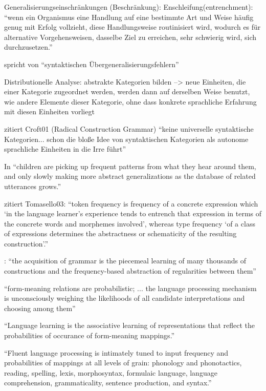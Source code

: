         Generalisierungseinschränkungen (Beschränkung):
        Enschleifung(entrenchment): ``wenn ein Organismus eine Handlung auf eine bestimmte Art und Weise häufig genug mit Erfolg vollzieht, diese Handlungsweise routinisiert wird, wodurch es für alternative Vorgehensweisen, dasselbe Ziel zu erreichen, sehr schwierig wird, sich durchzusetzen.''

        spricht von ``syntaktischen Übergeneralisierungsfehlern''

        Distributionelle Analyse: abstrakte Kategorien bilden --> neue Einheiten, die einer Kategorie zugeordnet werden, werden dann auf derselben Weise benutzt, wie andere Elemente dieser Kategorie, ohne dass konkrete sprachliche Erfahrung mit diesen Einheiten vorliegt

        \cite{Tomasello06} zitiert Croft01 (Radical Construction Grammar) ``keine universelle syntaktische Kategorien... schon die bloße Idee von syntaktischen Kategorien als autonome sprachliche Einheiten in die Irre führt''

        In \cite{Ellis08} ``children are picking up frequent patterns from what they hear around them, and only slowly making more abstract generalizations as the database of related utterances grows.''

        \cite{Eskildsen08} zitiert Tomasello03: ``token frequency is frequency of a concrete
        expression which ‘in the language learner’s experience tends to entrench
        that expression in terms of the concrete words and morphemes involved’,
        whereas type frequency ‘of a class of expressions determines the abstractness
        or schematicity of the resulting construction’.''

        \cite{Ellis04}: ``the acquisition of grammar is the piecemeal learning of many thousands of constructions and the frequency-based abstraction of regularities between them''

        ``form-meaning relations are probabilistic; ... the language processing mechanism is unconsciously weighing the likelihoods of all candidate interpretations and choosing among them''

        ``Language learning is the associative learning of representations that reflect the probabilities of occurance of form-meaning mappings.''

        ``Fluent language processing is intimately tuned to input frequency and probabilities of mappings at all levels of grain: phonology and phonotactics, reading, spelling, lexis, morphosyntax, formulaic language, language comprehension, grammaticality, sentence production, and syntax.''

